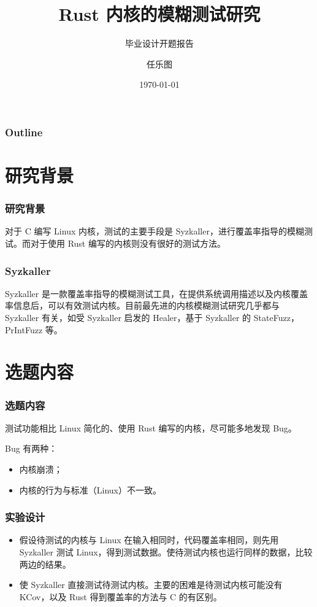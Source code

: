 \documentclass[UTF8]{ctexbeamer}
\title{Rust 内核的模糊测试研究}
\subtitle{毕业设计开题报告}
\author{任乐图}
\institute{清华大学计算机科学与技术系}
\date{\today}
\begin{document}
\begin{frame}
    \titlepage
\end{frame}

\begin{frame}
    \frametitle{Outline}
    \tableofcontents
\end{frame}

\section{研究背景}
\begin{frame}
    \frametitle{研究背景}
    对于 C 编写 Linux 内核，测试的主要手段是 Syzkaller，进行覆盖率指导的模糊测试。而对于使用 Rust 编写的内核则没有很好的测试方法。
\end{frame}

\begin{frame}
    \frametitle{Syzkaller}
    Syzkaller 是一款覆盖率指导的模糊测试工具，在提供系统调用描述以及内核覆盖率信息后，可以有效测试内核。目前最先进的内核模糊测试研究几乎都与 Syzkaller 有关，如受 Syzkaller 启发的 Healer\cite{healer}，基于 Syzkaller 的 StateFuzz\cite{statefuzz}，PrIntFuzz\cite{printfuzz} 等。
\end{frame}

\section{选题内容}
\begin{frame}
    \frametitle{选题内容}
    测试功能相比 Linux 简化的、使用 Rust 编写的内核，尽可能多地发现 Bug。

    Bug 有两种：
    \begin{itemize}
        \item 内核崩溃；
        \item 内核的行为与标准（Linux）不一致。
    \end{itemize}
\end{frame}

\begin{frame}
    \frametitle{实验设计}
    \begin{itemize}
        \item 假设待测试的内核与 Linux 在输入相同时，代码覆盖率相同，则先用 Syzkaller 测试 Linux，得到测试数据。使待测试内核也运行同样的数据，比较两边的结果。
        \item 使 Syzkaller 直接测试待测试内核。主要的困难是待测试内核可能没有 KCov，以及 Rust 得到覆盖率的方法与 C 的有区别。
    \end{itemize}
\end{frame}
\end{document}

